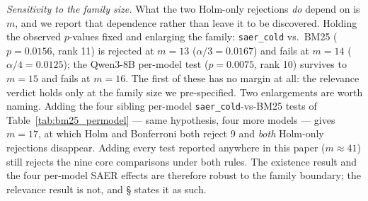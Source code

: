 \documentclass[letterpaper]{article} %
\newcommand{\bodyref}[1]{\getrefnumber{#1}}
\begin{document}
\emph{Sensitivity to the family size.}  What the two Holm-only rejections
\emph{do} depend on is $m$, and we report that dependence rather than
leave it to be discovered.  Holding the observed $p$-values fixed and
enlarging the family: \texttt{saer\_cold} vs.\ BM25 ($p{=}0.0156$, rank
11) is rejected at $m{=}13$ ($\alpha/3{=}0.0167$) and fails at
$m{=}14$ ($\alpha/4{=}0.0125$); the Qwen3-8B per-model test
($p{=}0.0075$, rank 10) survives to $m{=}15$ and fails at $m{=}16$.  The
first of these has no margin at all: the relevance verdict holds only at
the family size we pre-specified.  Two enlargements are worth naming.
Adding the four sibling per-model \texttt{saer\_cold}-vs-BM25 tests of
Table~\ref{tab:bm25_permodel} --- same hypothesis, four more models ---
gives $m{=}17$, at which Holm and Bonferroni both reject 9 and
\emph{both} Holm-only rejections disappear.  Adding every test reported
anywhere in this paper ($m{\approx}41$) still rejects the nine core
comparisons under both rules.  The existence result and the four
per-model SAER effects are therefore robust to the family boundary; the
relevance result is not, and \S\bodyref{sec:ablation} states it as such.
\end{document}
